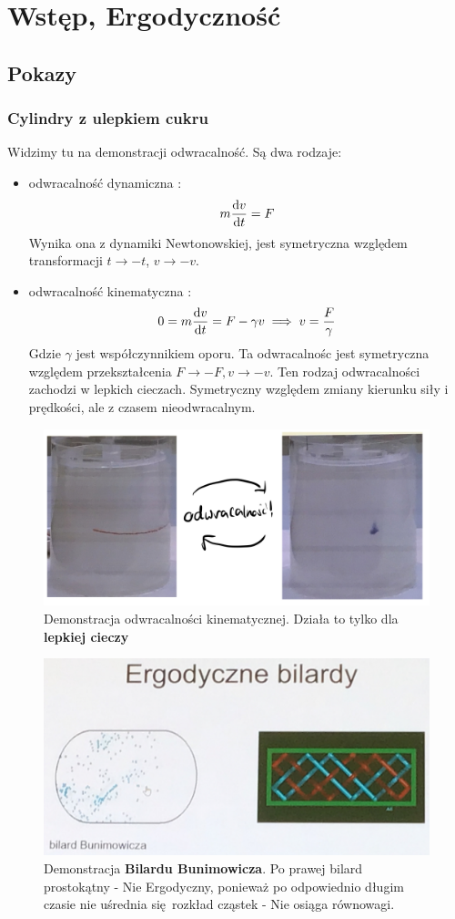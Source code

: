 \documentclass[12pt,a4paper]{report}
\newcommand{\ind}[1]{{\color{blue} #1\index{#1}}}
\renewcommand{\emph}{\textbf}
\newenvironment{lecture}[1]{\par\medskip
   \noindent\chapter{#1} \rmfamily}{\medskip}
\begin{document}
\begin{lecture}{Wstęp, Ergodyczność}
\FloatBarrier

\section{Pokazy}
\subsection{Cylindry z ulepkiem cukru}
Widzimy tu na demonstracji \ind{odwracalność}. Są dwa rodzaje:
\begin{itemize}
    \item {\color{blue} odwracalność dynamiczna} :
    \[m \dv{v}{t} = F\]
    Wynika ona z dynamiki Newtonowskiej, jest symetryczna względem transformacji $t \to -t$, $v \to -v$.
    \item {\color{blue} odwracalność kinematyczna} :
    \[0 = m \dv{v}{t} = F - \gamma v \implies v = \frac{F}{\gamma}\]
    Gdzie $\gamma$ jest współczynnikiem oporu. Ta odwracalnośc jest symetryczna względem przekształcenia $F \to -F, v \to -v$. Ten rodzaj odwracalności zachodzi w lepkich cieczach. Symetryczny względem zmiany kierunku siły i prędkości, ale z czasem nieodwracalnym.
\end{itemize}

\begin{figure}[!ht]
    \centering
    \includegraphics[width=0.8\linewidth]{Wyk_1_Rys_2.jpeg}
    \caption{Demonstracja odwracalności kinematycznej. Działa to tylko dla \emph{lepkiej cieczy}}
    \label{fig:lec_1:odwracalność}
\end{figure}

\begin{figure}[!ht]
    \centering
    \includegraphics[width=0.8\linewidth]{Wyk_1_Rys_3.jpeg}
    \caption{Demonstracja \emph{Bilardu Bunimowicza}. Po prawej bilard prostokątny - Nie Ergodyczny, ponieważ po odpowiednio długim czasie nie uśrednia się rozkład cząstek - Nie osiąga równowagi.}
    \label{fig:lec1:bilardbunimowicza}
\end{figure}


\end{lecture}
\end{document}
